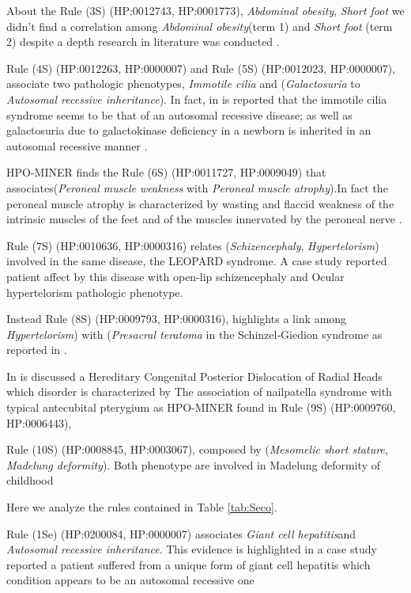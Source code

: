 \documentclass{article}
\theoremstyle{definition}
\begin{document}
About the Rule (3S) (HP:0012743, HP:0001773), \textit{Abdominal obesity}, \textit{Short foot} we didn't find a correlation among \textit{Abdominal obesity}(term 1) and \textit{Short foot} (term 2) despite a depth research in literature was conducted .

Rule (4S) (HP:0012263, HP:0000007) and Rule (5S) (HP:0012023, HP:0000007), associate two pathologic phenotypes, \textit{Immotile cilia} and (\textit{Galactosuria} to \textit{Autosomal recessive inheritance}). In fact, in \cite{afzelius1985immotile} is reported that the immotile cilia syndrome seems to be that of an autosomal recessive disease; as well as   galactosuria due to galactokinase deficiency in a newborn is inherited in an autosomal recessive manner \cite{pickering1972galactokinase}.

HPO-MINER finds the Rule (6S) (HP:0011727, HP:0009049) that associates(\textit{Peroneal muscle weakness} with \textit{Peroneal muscle atrophy}).In fact the peroneal muscle atrophy is characterized
by wasting and flaccid weakness of the intrinsic muscles of the feet and of the muscles innervated by the peroneal nerve \cite{buchthal1977peroneal}.

Rule (7S) (HP:0010636, HP:0000316) relates (\textit{Schizencephaly}, \textit{Hypertelorism}) involved in the same disease, the LEOPARD syndrome. A case study \cite{liang2009schizencephaly} reported patient affect by this disease with open-lip schizencephaly and Ocular hypertelorism pathologic phenotype.

Instead Rule (8S) (HP:0009793, HP:0000316), highlights a link among \textit{Hypertelorism}) with (\textit{Presacral teratoma} in the Schinzel‐Giedion syndrome as reported in \cite{robin1993new}.


In \cite{reichenbach1995hereditary} is discussed a Hereditary Congenital Posterior Dislocation
of Radial Heads which disorder is characterized by The association of nailpatella syndrome
with typical antecubital pterygium as HPO-MINER found in Rule (9S) (HP:0009760, HP:0006443), 

Rule (10S) (HP:0008845, HP:0003067), composed by (\textit{Mesomelic short stature}, \textit{Madelung deformity}). Both phenotype are involved in Madelung deformity of childhood \cite{flanagan2002prevalence}





Here we analyze the rules contained in Table \ref{tab:Seco}.

Rule (1Se) (HP:0200084, HP:0000007) associates \textit{Giant cell hepatitis}and  \textit{Autosomal recessive inheritance}. This evidence is highlighted in a case study reported a patient suffered from a unique form of giant cell hepatitis which condition appears to be an autosomal recessive one\cite{clayton1987familial}
\end{document}
